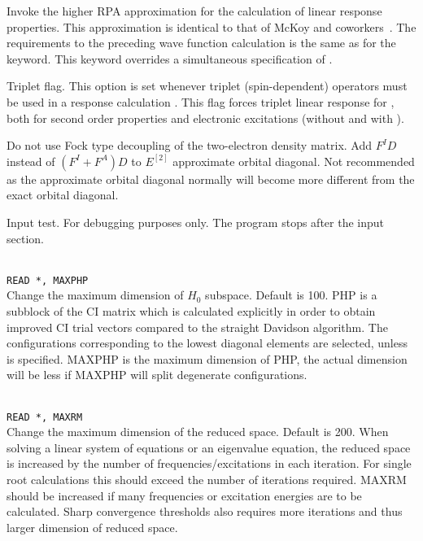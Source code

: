 \begin{description}
\item{}
Invoke the higher RPA approximation for the calculation of linear
response properties.
This approximation is identical to that of McKoy
and coworkers~\cite{jrtsvmjcp58,tsjrvmjcp58}. The requirements to the
preceding wave function 
calculation is the same as for the  keyword.
This keyword overrides a simultaneous specification of .

\item{}
Triplet flag. This option is set whenever triplet
(spin-dependent)
operators must be used in a response calculation
\cite{jodlypjjcp91,ovhapjhjajthjojcp97}.
This flag forces triplet linear response for ,
both for second order properties and electronic excitations
(without and with ).

\item{}
Do not use Fock type decoupling of the two-electron density matrix.
Add $F^ID$ instead of $(F^I+F^A)D$ to $E^{[2]}$ approximate
orbital diagonal. Not recommended as the approximate orbital diagonal
normally will become more different from the exact orbital diagonal.

\item{}
Input test. For debugging purposes only. The program stops after the
input section.

\item{}\\
\verb|READ *, MAXPHP|\\
Change the maximum dimension of $H_0$ subspace.   Default is 100.
PHP is a subblock of the CI matrix which is calculated explicitly
in order to obtain improved CI trial vectors compared to the
straight Davidson algorithm\cite{erdjcp17}.  The configurations
corresponding to 
the lowest diagonal elements are selected, unless  is
specified. MAXPHP is the maximum dimension of PHP, the 
actual dimension will be less if MAXPHP will split degenerate configurations.
 
\item{}\\
\verb|READ *, MAXRM |\\
Change the maximum dimension of the reduced space. Default is 200.
When solving a linear system of equations or an eigenvalue equation,
the reduced space is increased by the number of
frequencies/excitations in each iteration. For single root
calculations this should exceed the number of iterations required.
MAXRM should be increased if many frequencies or excitation energies
are to be calculated.
Sharp convergence thresholds also requires
more iterations and thus larger dimension of reduced space.


\end{description}
